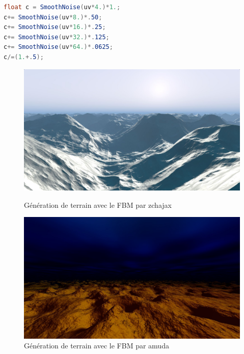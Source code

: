 \begin{minipage}{\linewidth}
\begin{lstlisting}[language=GLSL, caption=FBM,captionpos=b,frame=single]
float c = SmoothNoise(uv*4.)*1.;
c+= SmoothNoise(uv*8.)*.50;
c+= SmoothNoise(uv*16.)*.25;
c+= SmoothNoise(uv*32.)*.125;
c+= SmoothNoise(uv*64.)*.0625;
c/=(1.+.5);
\end{lstlisting}
\end{minipage}

\begin{figure}[h]
  \begin{minipage}[b]{0.45\linewidth}
    \centering
    \includegraphics[width=\linewidth]{images/post_process/fbm00.JPG}
    \caption{Génération de terrain avec le FBM par zchajax}
    \label{fbm00}
  \end{minipage}
  \hspace{0.1\linewidth} %
  \begin{minipage}[b]{0.45\linewidth}
    \centering
    \includegraphics[width=\linewidth]{images/post_process/fbm01.JPG}
    \caption{Génération de terrain avec le FBM par amuda}
    \label{fbm01}
  \end{minipage}
\end{figure}


